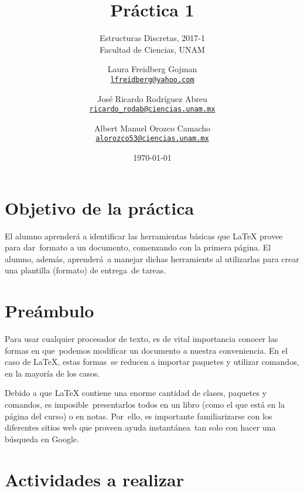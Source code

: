 \documentclass[paper=letter, fontsize=12pt]{scrartcl}
\title{Práctica 1}
\subtitle{
  Estructuras Discretas, 2017-1\\
  Facultad de Ciencias, UNAM
}
\author{
  \normalsize
  Laura Freidberg Gojman\\
  \normalsize
  \texttt{\href{mailto:lfreidberg@yahoo.com}{lfreidberg@yahoo.com}}
  \and
  \normalsize
  José Ricardo Rodríguez Abreu\\
  \normalsize
  \texttt{\href{mailto:ricardo_rodab@ciencias.unam.mx}{ricardo\_rodab@ciencias.unam.mx}}
  \and
  \normalsize
  Albert Manuel Orozco Camacho\\
  \normalsize
  \texttt{\href{mailto:alorozco53@ciencias.unam.mx}{alorozco53@ciencias.unam.mx}}
}
\date{\today}
\begin{document}
\maketitle

\section*{Objetivo de la práctica}

\noindent
El alumno aprenderá a identificar las herramientas básicas que \LaTeX{} provee para dar\
formato a un documento, comenzando con la primera página. El alumno, además, aprenderá\
a manejar dichas herramients al utilizarlas para crear una plantilla (formato) de entrega\
de tareas.

\section*{Preámbulo}

\noindent
Para usar cualquier procesador de texto, es de vital importancia conocer las formas en que\
podemos modificar un documento a nuestra conveniencia. En el caso de \LaTeX, estas formas\
se reducen a importar paquetes y utilizar comandos, en la mayoría de los casos.\par
Debido a que \LaTeX{} contiene una enorme cantidad de clases, paquetes y comandos, es imposible\
presentarlos todos en un libro (como el que está en la página del curso) o en notas. Por\
ello, es importante familiarizarse con los diferentes sitios web que proveen ayuda instantánea\
tan solo con hacer una búsqueda en Google.

\section*{Actividades a realizar}
\end{document}
